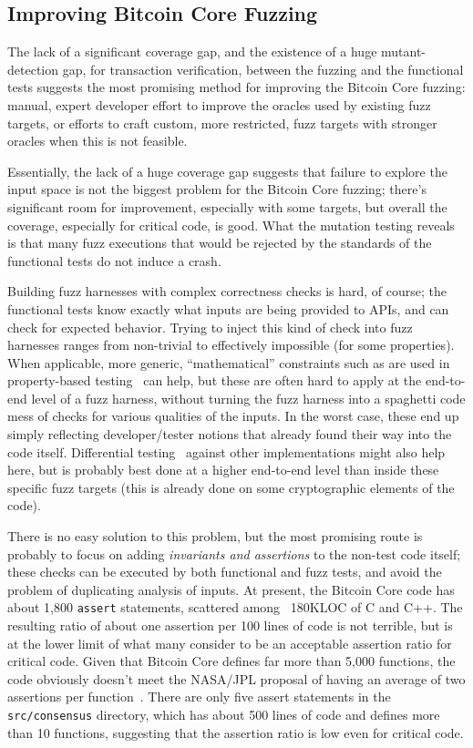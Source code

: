\subsection{Improving Bitcoin Core Fuzzing}

The lack of a significant coverage gap, and the existence of a huge
mutant-detection gap, for transaction verification, between the fuzzing and the functional tests
suggests the most promising method for improving the Bitcoin Core
fuzzing: manual, expert developer effort to improve the
oracles used by existing fuzz targets, or efforts to craft custom,
more restricted, fuzz targets with stronger oracles when this is not
feasible.

Essentially, the lack of a huge coverage gap suggests that failure to
explore the input space is not the biggest problem for the Bitcoin
Core fuzzing; there's significant room for improvement, especially
with some targets, but overall the coverage, especially for critical
code, is good.  What the mutation testing reveals is that many fuzz
executions that would be rejected by the standards of the functional
tests do not induce a crash.

Building fuzz harnesses with complex correctness checks is hard, of
course; the functional tests know exactly what inputs are being
provided to APIs, and can check for expected behavior.  Trying to
inject this kind of check into fuzz harnesses ranges from non-trivial
to effectively impossible (for some properties).  When
applicable, more generic, ``mathematical'' constraints such as are
used in property-based testing~\cite{ClaessenH00} can help, but these
are often hard to apply at the end-to-end level of a fuzz harness,
without turning the fuzz harness into a spaghetti code mess of
checks for various qualities of the inputs.  In the worst case, these
end up simply reflecting developer/tester notions that already found
their way into the code itself.  Differential testing~\cite{Differential} against other
implementations might also help here, but is probably best done at a
higher end-to-end level than inside these specific fuzz targets (this
is already done on some cryptographic elements of the code).

There is no
easy solution to this problem, but the most promising route is
probably to focus
on adding \emph{invariants and assertions} to the non-test code itself; these checks can be executed by
both functional and fuzz tests, and avoid the problem of duplicating
analysis of inputs.  At
present, the Bitcoin Core code has about 1,800 {\tt assert}
statements, scattered among  ~180KLOC of C and C++.  The resulting ratio
of about one assertion per 100 lines of code is not terrible, but is
at the lower limit of what many consider to be an acceptable assertion
ratio for critical code.
Given that Bitcoin Core defines far more than 5,000 functions, the code obviously
doesn't meet the NASA/JPL proposal of having an average of two
assertions per function~\cite{holzmann2006power}.  There are only five assert
statements in the {\tt src/consensus} directory, which has about 500
lines of code and defines more than 10 functions, suggesting that the assertion ratio is low even for
critical code.

